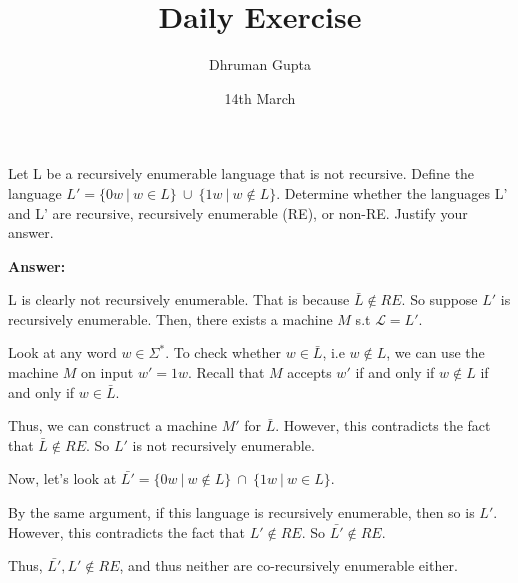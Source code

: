 \documentclass[11pt]{article}
\title{Daily Exercise}
\author{Dhruman Gupta}
\date{14th March}
\begin{document}

Let L be a recursively enumerable language that is not recursive. Define the language $L' = \{0w\ |\ w \in L\}\ \cup\ \{1w\ |\ w \notin L\}$.
Determine whether the languages L' and L' are recursive, recursively enumerable (RE), or non-RE. Justify your answer.

\textbf{Answer:}

L is clearly not recursively enumerable. That is because $\bar{L} \notin RE$. So suppose $L'$ is recursively enumerable. Then, there exists a machine $M$ s.t $\mathcal{L} = L'$. 

Look at any word $w \in \Sigma^*$. To check whether $w \in \bar{L}$, i.e $w \notin L$, we can use the machine $M$ on input $w' = 1w$. Recall that $M$ accepts $w'$ if and only if $w \notin L$ if and only if $w \in \bar{L}$.

Thus, we can construct a machine $M'$ for $\bar{L}$. However, this contradicts the fact that $\bar{L} \notin RE$. So $L'$ is not recursively enumerable.

Now, let's look at $\bar{L'} = \{0w\ |\ w \notin L\}\ \cap\ \{1w\ |\ w \in L\}$.

By the same argument, if this language is recursively enumerable, then so is $L'$. However, this contradicts the fact that $L' \notin RE$. So $\bar{L'} \notin RE$.

Thus, $\bar{L'}, L' \notin RE$, and thus neither are co-recursively enumerable either.
\end{document}
